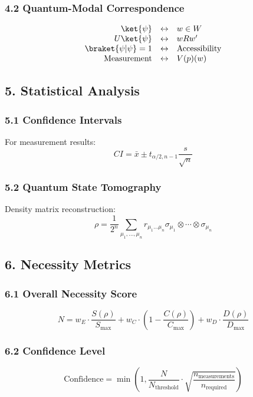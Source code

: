 \subsubsection*{4.2 Quantum-Modal Correspondence}
\begin{equation}
    \begin{array}{rcl}
        \ket{\psi} & \leftrightarrow & w \in W \\
        U\ket{\psi} & \leftrightarrow & wRw' \\
        \braket{\psi|\psi} = 1 & \leftrightarrow & \text{Accessibility} \\
        \text{Measurement} & \leftrightarrow & V(p)(w)
    \end{array}
\end{equation}

\subsection*{5. Statistical Analysis}

\subsubsection*{5.1 Confidence Intervals}
For measurement results:
\begin{equation}
    CI = \bar{x} \pm t_{\alpha/2,n-1}\frac{s}{\sqrt{n}}
\end{equation}

\subsubsection*{5.2 Quantum State Tomography}
Density matrix reconstruction:
\begin{equation}
    \rho = \frac{1}{2^n}\sum_{\mu_1,\ldots,\mu_n} r_{\mu_1\ldots\mu_n}\sigma_{\mu_1}\otimes\cdots\otimes\sigma_{\mu_n}
\end{equation}

\subsection*{6. Necessity Metrics}

\subsubsection*{6.1 Overall Necessity Score}
\begin{equation}
    N = w_E\cdot\frac{S(\rho)}{S_{\text{max}}} + w_C\cdot(1-\frac{C(\rho)}{C_{\text{max}}}) + w_D\cdot\frac{D(\rho)}{D_{\text{max}}}
\end{equation}

\subsubsection*{6.2 Confidence Level}
\begin{equation}
    \text{Confidence} = \min\left(1, \frac{N}{N_{\text{threshold}}}\cdot\sqrt{\frac{n_{\text{measurements}}}{n_{\text{required}}}}\right)
\end{equation}